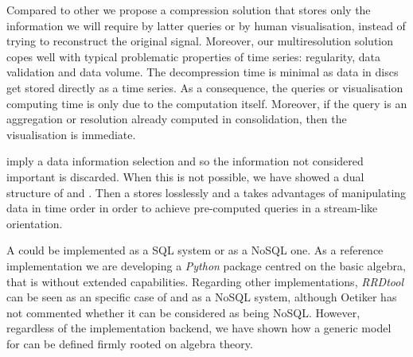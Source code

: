 Compared to other  we propose a compression solution that
stores only the information we will require by latter queries or by
human visualisation, instead of trying to reconstruct the original
signal.  Moreover, our multiresolution solution copes well with
typical problematic properties of time series: regularity, data
validation and data volume.  The decompression time is minimal as data
in discs get stored directly as a time series. As a consequence, the
queries or visualisation computing time is only due to the computation
itself. Moreover, if the query is an aggregation or resolution already
computed in  consolidation, then the visualisation is
immediate.


 imply a data information selection and so the information
not considered important is discarded. When this is not possible, we
have showed a dual structure of  and . Then a
 stores losslessly and a  takes advantages of
manipulating data in time order in order to achieve pre-computed
queries in a stream-like orientation.





A  could be implemented as a SQL  system or as
a NoSQL one. As a reference implementation we are developing a
\emph{Python} package centred on the basic algebra, that is without
extended  capabilities. Regarding other implementations,
\emph{RRDtool} can be seen as an specific case of  and as
a NoSQL system, although Oetiker \cite{rrdtool} has not commented
whether it can be considered as being NoSQL. However, regardless of
the implementation backend, we have shown how a generic model for
 can be defined firmly rooted on  algebra
theory.









